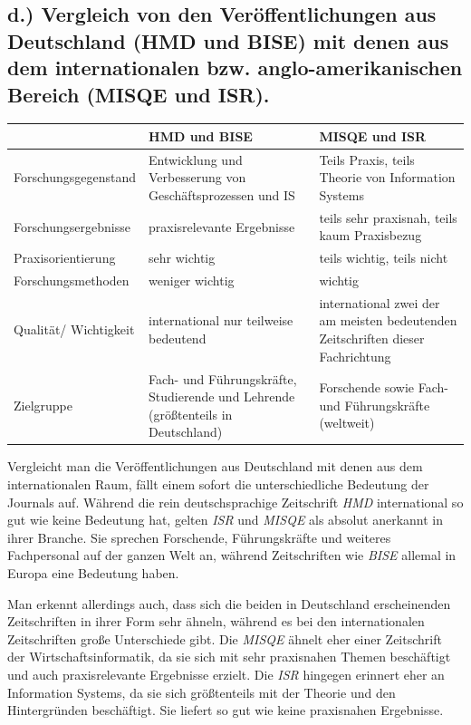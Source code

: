 \documentclass[12pt,utf8]{scrartcl}
\begin{document}
\subsection{\label{sub4:einfuehrung}d.) Vergleich von den Veröffentlichungen aus Deutschland (HMD und BISE) mit denen aus dem internationalen bzw. anglo-amerikanischen Bereich (MISQE und ISR).}

\begin{tabular}{|p{4cm}|p{5.5cm}|p{5.5cm}|}
\hline
& HMD und BISE & MISQE und ISR \\
\hline
Forschungsgegenstand & Entwicklung und Verbesserung von Geschäftsprozessen und IS & Teils Praxis, teils Theorie von Information Systems \\
\hline
Forschungsergebnisse & praxisrelevante Ergebnisse & teils sehr praxisnah, teils kaum Praxisbezug \\
\hline
Praxisorientierung & sehr wichtig & teils wichtig, teils nicht \\
\hline
Forschungsmethoden & weniger wichtig & wichtig \\
\hline
Qualität/ Wichtigkeit & international nur teilweise bedeutend & international zwei der am meisten bedeutenden Zeitschriften dieser Fachrichtung \\
\hline
Zielgruppe & Fach- und Führungskräfte, Studierende und Lehrende (größtenteils in Deutschland) & Forschende sowie Fach- und Führungskräfte (weltweit) \\
\hline
\end{tabular}
\newline
\newline
\newline

Vergleicht man die Veröffentlichungen aus Deutschland mit denen aus dem internationalen Raum, fällt einem sofort die unterschiedliche Bedeutung der Journals auf. Während die rein deutschsprachige Zeitschrift \emph{HMD} international so gut wie keine Bedeutung hat, gelten \emph{ISR} und \emph{MISQE} als absolut anerkannt in ihrer Branche. Sie sprechen Forschende, Führungskräfte und weiteres Fachpersonal auf der ganzen Welt an, während Zeitschriften wie \emph{BISE} allemal in Europa eine Bedeutung haben\cite{VHBJ}. 

Man erkennt allerdings auch, dass sich die beiden in Deutschland erscheinenden Zeitschriften in ihrer Form sehr ähneln, während es bei den internationalen Zeitschriften große Unterschiede gibt. Die \emph{MISQE} ähnelt eher einer Zeitschrift der Wirtschaftsinformatik, da sie  sich mit sehr praxisnahen Themen beschäftigt und auch praxisrelevante Ergebnisse erzielt. Die \emph{ISR} hingegen erinnert eher an Information Systems, da sie sich größtenteils mit der Theorie und den Hintergründen beschäftigt. Sie liefert so gut wie keine praxisnahen Ergebnisse. 
\newline
\end{document}
